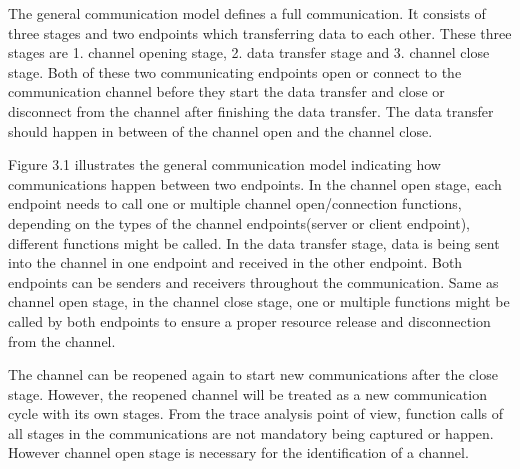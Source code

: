 The general communication model defines a full communication. It consists of three stages
and two endpoints which transferring data to each other. These three stages are 1. channel opening
stage, 2. data transfer stage and 3. channel close stage. Both of these two communicating endpoints
open or connect to the communication channel before they start the data transfer and close or disconnect from the channel after finishing the data transfer. The data transfer should happen in between of the channel open and the channel close.

Figure 3.1 illustrates the general communication model indicating how communications happen
between two endpoints. In the channel open stage, each endpoint needs to call one or multiple
channel open/connection functions, depending on the types of the channel endpoints(server
or client endpoint), different functions might be called. In the data transfer stage, data is being sent into the channel in one endpoint and received in the other endpoint. Both endpoints can be senders and receivers throughout the communication. Same as channel open stage, in the channel
close stage, one or multiple functions might be called by both endpoints to ensure a proper resource release and disconnection from the channel.

The channel can be reopened again to start new communications after the close stage. However,
the reopened channel will be treated as a new communication cycle with its own stages. From the
trace analysis point of view, function calls of all stages in the communications are not mandatory
being captured or happen. However channel open stage is necessary for the identification of a
channel.

